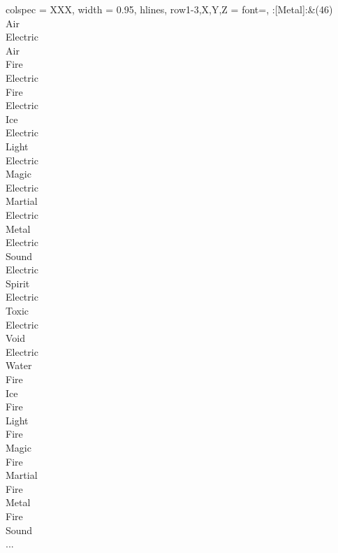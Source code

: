 \begin{longtblr}[
	caption = {2v1 Defending Resisted},
	label = {2v1-Defending-Resisted},
]{
	colspec = {XXX}, width = 0.95\linewidth,
	hlines,
	row{1-3,X,Y,Z} = {font=\bfseries},
}
	:[Metal]:&{(46)\\
	Air \\
	Electric \\
	Air \\
	Fire \\
	Electric \\
	Fire \\
	Electric \\
	Ice \\
	Electric \\
	Light \\
	Electric \\
	Magic \\
	Electric \\
	Martial \\
	Electric \\
	Metal \\
	Electric \\
	Sound \\
	Electric \\
	Spirit \\
	Electric \\
	Toxic \\
	Electric \\
	Void \\
	Electric \\
	Water \\
	Fire \\
	Ice \\
	Fire \\
	Light \\
	Fire \\
	Magic \\
	Fire \\
	Martial \\
	Fire \\
	Metal \\
	Fire \\
	Sound \\
	...\\
	}\\


\end{longtblr}
